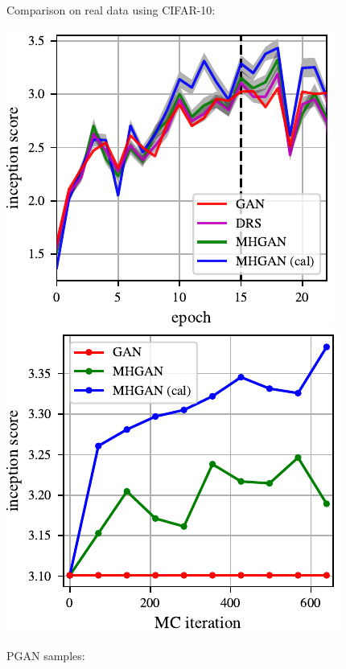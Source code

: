 \documentclass[a0,landscape]{a0poster}
\begin{document}
\begin{multicols}{3}
\begin{center}
\end{center}

\columnbreak

Comparison on real data using CIFAR-10:
\begin{center}
\includegraphics[scale=2.5]{../figures/per_epoch.pdf}
\includegraphics[scale=2.5]{../figures/plot_per_mh.pdf}
\end{center}

PGAN samples:


\end{multicols}
\end{document}
